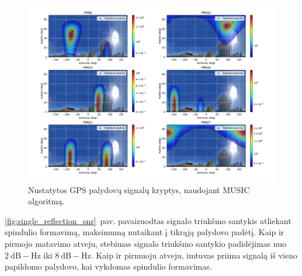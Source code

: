 \documentclass[main.tex]{subfiles}
\begin{document}
\begin{figure}[ht]
    \begin{centering}
    \includegraphics[scale=0.45]{drawings/one_reflection_2}
    \par\end{centering}
    \protect\caption{\label{fig:single_reflection}Nustatytos GPS palydovų signalų kryptys, naudojant MUSIC algoritmą.}
\end{figure}

\ref{fig:single_reflection_snr}~pav. pavaizuodtas signalo triukšmo santykis atliekant spindulio formavimą,
maksimumą nutaikant į tikrąją palydovo padėtį. Kaip ir pirmojo matavimo atveju, stebimas signalo triukšmo
santykio padidėjimas
nuo $2\ \mathrm{dB-Hz}$ iki $8\ \mathrm{dB-Hz}$. Kaip ir pirmuoju atveju,
imtuvas priima signalą iš vieno papildomo palydovo, kai vykdomas spindulio formavimas.
\end{document}
